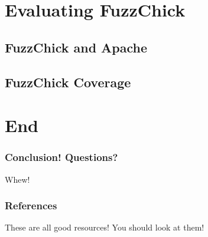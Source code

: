 \documentclass{beamer}
\begin{document}
\section{Evaluating FuzzChick}

\subsection{FuzzChick and Apache}

\subsection{FuzzChick Coverage}

\section{End}

\begin{frame}
  \frametitle{Conclusion! Questions?}

  \huge{Whew!}
\end{frame}

\begin{frame}
  \frametitle{References}

  \nocite{*}
  \printbibliography

  These are all good resources! You should look at them!
\end{frame}
\end{document}
